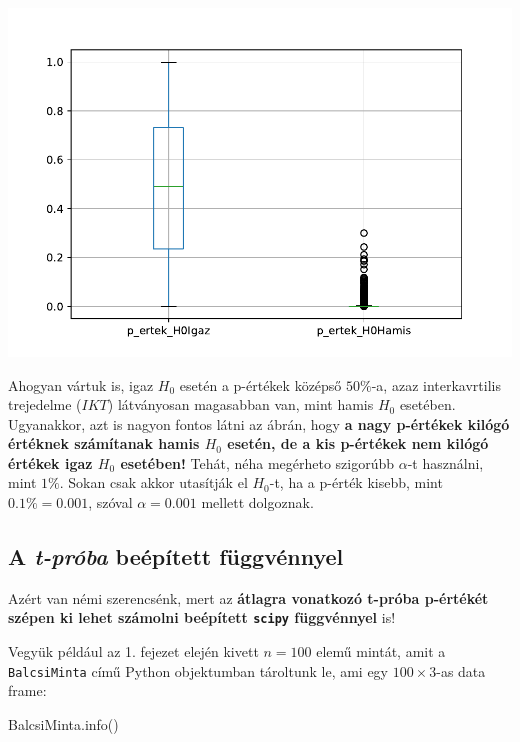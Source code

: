 \documentclass[
]{book}
\newenvironment{Shaded}{\begin{snugshade}}{\end{snugshade}}
\newcommand{\NormalTok}[1]{#1}
\begin{document}
\includegraphics{_main_files/figure-latex/unnamed-chunk-342-25.pdf}

Ahogyan vártuk is, igaz \(H_0\) esetén a p-értékek középső \(50\%\)-a, azaz interkavrtilis trejedelme (\(IKT\)) látványosan magasabban van, mint hamis \(H_0\) esetében. Ugyanakkor, azt is nagyon fontos látni az ábrán, hogy \textbf{a nagy p-értékek kilógó értéknek számítanak hamis \(H_0\) esetén, de a kis p-értékek nem kilógó értékek igaz \(H_0\) esetében!} Tehát, néha megérheto szigorúbb \(\alpha\)-t használni, mint \(1\%\). Sokan csak akkor utasítják el \(H_0\)-t, ha a p-érték kisebb, mint \(0.1\%=0.001\), szóval \(\alpha=0.001\) mellett dolgoznak.

\subsection{\texorpdfstring{A \emph{t-próba} beépített függvénnyel}{A t-próba beépített függvénnyel}}\label{a-t-pruxf3ba-beuxe9puxedtett-fuxfcggvuxe9nnyel}

Azért van némi szerencsénk, mert az \textbf{átlagra vonatkozó t-próba p-értékét szépen ki lehet számolni beépített \texttt{scipy} függvénnyel} is!

Vegyük például az 1. fejezet elején kivett \(n=100\) elemű mintát, amit a \texttt{BalcsiMinta} című Python objektumban tároltunk le, ami egy \(100\times3\)-as data frame:

\begin{Shaded}
\begin{Highlighting}[]
\NormalTok{BalcsiMinta.info()}
\end{Highlighting}
\end{Shaded}
\end{document}
